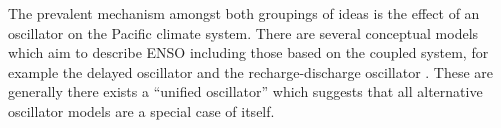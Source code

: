 \documentclass[12pt, onecolumn]{revtex4}    %
\begin{document}
The prevalent mechanism amongst both groupings of ideas is the effect of an oscillator on the Pacific climate system. There are several conceptual models which aim to describe ENSO including those based on the coupled system, for example the delayed oscillator \citep{Suarez:1988aa, Battisti:1988aa} and the recharge-discharge oscillator \citep{Jin:1997aa}. These are generally there exists a ``unified oscillator'' \citep{Wang:2001aa} which suggests that all alternative oscillator models are a special case of itself. \\



\newpage

\nocite{ruddiman_climate}


\end{document}
